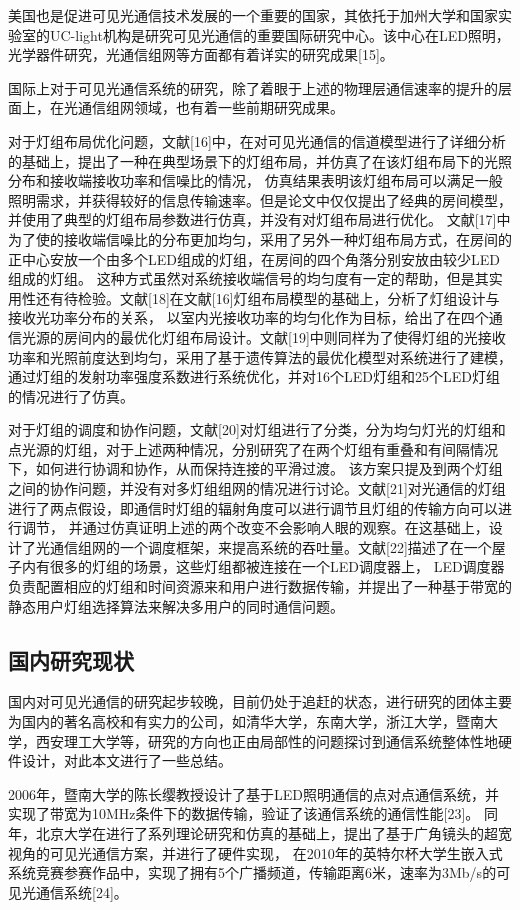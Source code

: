 美国也是促进可见光通信技术发展的一个重要的国家，其依托于加州大学和国家实验室的UC-light机构是研究可见光通信的重要国际研究中心。该中心在LED照明，光学器件研究，光通信组网等方面都有着详实的研究成果[15]。

国际上对于可见光通信系统的研究，除了着眼于上述的物理层通信速率的提升的层面上，在光通信组网领域，也有着一些前期研究成果。

对于灯组布局优化问题，文献[16]中，在对可见光通信的信道模型进行了详细分析的基础上，提出了一种在典型场景下的灯组布局，并仿真了在该灯组布局下的光照分布和接收端接收功率和信噪比的情况，
仿真结果表明该灯组布局可以满足一般照明需求，并获得较好的信息传输速率。但是论文中仅仅提出了经典的房间模型，并使用了典型的灯组布局参数进行仿真，并没有对灯组布局进行优化。
文献[17]中为了使的接收端信噪比的分布更加均匀，采用了另外一种灯组布局方式，在房间的正中心安放一个由多个LED组成的灯组，在房间的四个角落分别安放由较少LED组成的灯组。
这种方式虽然对系统接收端信号的均匀度有一定的帮助，但是其实用性还有待检验。文献[18]在文献[16]灯组布局模型的基础上，分析了灯组设计与接收光功率分布的关系，
以室内光接收功率的均匀化作为目标，给出了在四个通信光源的房间内的最优化灯组布局设计。文献[19]中则同样为了使得灯组的光接收功率和光照前度达到均匀，采用了基于遗传算法的最优化模型对系统进行了建模，
通过灯组的发射功率强度系数进行系统优化，并对16个LED灯组和25个LED灯组的情况进行了仿真。

对于灯组的调度和协作问题，文献[20]对灯组进行了分类，分为均匀灯光的灯组和点光源的灯组，对于上述两种情况，分别研究了在两个灯组有重叠和有间隔情况下，如何进行协调和协作，从而保持连接的平滑过渡。
该方案只提及到两个灯组之间的协作问题，并没有对多灯组组网的情况进行讨论。文献[21]对光通信的灯组进行了两点假设，即通信时灯组的辐射角度可以进行调节且灯组的传输方向可以进行调节，
并通过仿真证明上述的两个改变不会影响人眼的观察。在这基础上，设计了光通信组网的一个调度框架，来提高系统的吞吐量。文献[22]描述了在一个屋子内有很多的灯组的场景，这些灯组都被连接在一个LED调度器上，
LED调度器负责配置相应的灯组和时间资源来和用户进行数据传输，并提出了一种基于带宽的静态用户灯组选择算法来解决多用户的同时通信问题。

\subsection{国内研究现状}
国内对可见光通信的研究起步较晚，目前仍处于追赶的状态，进行研究的团体主要为国内的著名高校和有实力的公司，如清华大学，东南大学，浙江大学，暨南大学，西安理工大学等，研究的方向也正由局部性的问题探讨到通信系统整体性地硬件设计，对此本文进行了一些总结。

2006年，暨南大学的陈长缨教授设计了基于LED照明通信的点对点通信系统，并实现了带宽为10MHz条件下的数据传输，验证了该通信系统的通信性能[23]。
同年，北京大学在进行了系列理论研究和仿真的基础上，提出了基于广角镜头的超宽视角的可见光通信方案，并进行了硬件实现，
在2010年的英特尔杯大学生嵌入式系统竞赛参赛作品中，实现了拥有5个广播频道，传输距离6米，速率为3Mb/s的可见光通信系统[24]。

